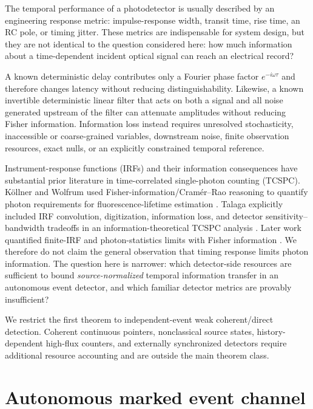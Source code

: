 \documentclass[aps,prapplied,preprint,nofootinbib]{revtex4-2}
\begin{document}
The temporal performance of a photodetector is usually described by an engineering response metric: impulse-response width, transit time, rise time, an RC pole, or timing jitter. These metrics are indispensable for system design, but they are not identical to the question considered here: how much information about a time-dependent incident optical signal can reach an electrical record?

A known deterministic delay contributes only a Fourier phase factor $e^{-i\omega\tau}$ and therefore changes latency without reducing distinguishability. Likewise, a known invertible deterministic linear filter that acts on both a signal and all noise generated upstream of the filter can attenuate amplitudes without reducing Fisher information. Information loss instead requires unresolved stochasticity, inaccessible or coarse-grained variables, downstream noise, finite observation resources, exact nulls, or an explicitly constrained temporal reference.

Instrument-response functions (IRFs) and their information consequences have substantial prior literature in time-correlated single-photon counting (TCSPC). K\"ollner and Wolfrum used Fisher-information/Cram\'er--Rao reasoning to quantify photon requirements for fluorescence-lifetime estimation \cite{KollnerWolfrum1992}. Talaga explicitly included IRF convolution, digitization, information loss, and detector sensitivity--bandwidth tradeoffs in an information-theoretical TCSPC analysis \cite{Talaga2009}. Later work quantified finite-IRF and photon-statistics limits with Fisher information \cite{Bouchet2019,TrinhEsposito2021}. We therefore do not claim the general observation that timing response limits photon information. The question here is narrower: which detector-side resources are sufficient to bound \emph{source-normalized} temporal information transfer in an autonomous event detector, and which familiar detector metrics are provably insufficient?

We restrict the first theorem to independent-event weak coherent/direct detection. Coherent continuous pointers, nonclassical source states, history-dependent high-flux counters, and externally synchronized detectors require additional resource accounting and are outside the main theorem class.



\section{Autonomous marked event channel}
\end{document}
